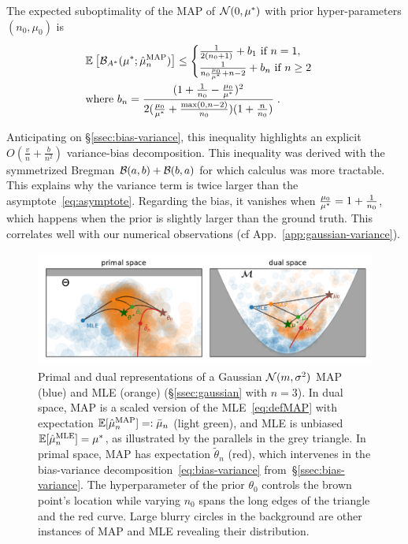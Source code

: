 \documentclass[twoside]{article}
\newcommand*{\expect}[2][]{\ensuremath{\mathbb{E}_{#1} \left[ #2 \right] }} %
\newcommand{\logpart}{A}
\newcommand{\bregmanconj}{\cB_{\logpart^*}}
\newcommand{\nat}{\theta}
\newcommand{\m}{\mu}
\begin{document}
\begin{theorem}
\label{thm:varianceMAP}
The expected suboptimality of the MAP of $\cN(0,\m^*)$ with prior hyper-parameters $(n_0,\m_0)$ is
 \begin{align}
	& \expect{\bregmanconj( \m^*; \hat \m_n^\mathrm{MAP})}
	\leq \begin{cases}
		\inv{2(n_0+1)}  +  b_1 \ \text{if}\ n=1,\\
		\frac{1}{n_0 \frac{\m_0}{\m^*} +n-2} + b_n \ \text{if}\ n\geq 2
	\end{cases}
	\label{eq:MAP_rate}\\
	& \text{where }b_n = \frac{(1 + \inv{n_0} - \frac{\m_0}{\m^*})^2}{2 (\frac{\m_0}{\m^*}+\frac{\max(0,n-2)}{n_0})(1 + \frac{n}{n_0} )} \; . \nonumber
\end{align}
\end{theorem}
Anticipating on \S\ref{ssec:bias-variance}, this inequality highlights an explicit $O(\frac{v}{n} + \frac{b}{n^2})$ variance-bias decomposition.
This inequality was derived with the symmetrized Bregman ${\mathcal B}(a,b) + {\mathcal B}(b,a)$ for which calculus was more tractable.
This explains why the variance term is twice larger than the asymptote~\eqref{eq:asymptote}.
Regarding the bias, it vanishes when $\frac{\m_0}{\m^*} =1 + \inv{n_0} $, which happens when the prior is slightly larger than the ground truth.
This correlates well with our numerical observations (cf App.~\ref{app:gaussian-variance}).

\begin{figure}[t]
	\centering
	\includegraphics[width=.8\textwidth]{figs/thales/numerical_schema_n=3.pdf}
	\caption{
	Primal and dual representations of a Gaussian ${\mathcal N}(m,\sigma^2)$ MAP (blue) and MLE (orange) (\S\ref{ssec:gaussian} with $n=3$).
	In dual space, MAP is a scaled version of the MLE~\eqref{eq:defMAP} with expectation $\E[\hat\m_n^\text{MAP}]=:\bar \m_n$ (light green), and MLE is unbiased $\E[\hat\m_n^\text{MLE}]=\m^*$, as illustrated by the parallels in the grey triangle.
	In primal space, MAP has expectation $\tilde \nat_n$ (red), which intervenes in the bias-variance decomposition~\eqref{eq:bias-variance} from~\S\ref{ssec:bias-variance}.
	The hyperparameter of the prior $\nat_0$ controls the brown point's location while varying $n_0$ spans the long edges of the triangle and the red curve.
	Large blurry circles in the background are other instances of MAP and MLE revealing their distribution.
	}
	\label{fig:thales}
\end{figure}
\end{document}
